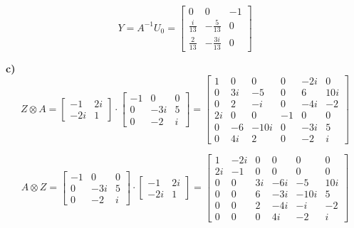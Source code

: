 \documentclass{article}
\begin{document}
\begin{equation}
    Y=A^{-1}U_0 = 
    \begin{bmatrix}
        0 & 0 & -1 \\
        \frac{i}{13} & -\frac{5}{13} & 0 \\
        \frac{2}{13} & -\frac{3i}{13} & 0 \nonumber
    \end{bmatrix}
\end{equation}


\textbf{c)}
\begin{equation}
    Z \otimes A=
    \begin{bmatrix} -1 & 2i \\ -2i & 1 \end{bmatrix}
    \cdot
    \begin{bmatrix}
-1 & 0 & 0 \\
0 & -3i & 5 \\
0 & -2 & i
\end{bmatrix}
=
\begin{bmatrix}
    1 & 0 & 0 & 0 & -2i & 0 \\
    0 & 3i & -5 & 0 & 6 & 10i \\
    0 & 2 & -i & 0 & -4i & -2 \\
    2i & 0 & 0 & -1 & 0 & 0 \\
    0 & -6 & -10i & 0 & -3i & 5 \\
    0 & 4i & 2 & 0 & -2 & i \nonumber
\end{bmatrix}
\end{equation}

\begin{equation}
    A \otimes Z=  
    \begin{bmatrix}
-1 & 0 & 0 \\
0 & -3i & 5 \\
0 & -2 & i
\end{bmatrix}
\cdot
    \begin{bmatrix} -1 & 2i \\ -2i & 1 \end{bmatrix}
=
\begin{bmatrix}
    1 & -2i & 0 & 0 & 0 & 0 \\
    2i & -1 & 0 & 0 & 0 & 0 \\
    0 & 0 & 3i & -6i & -5 & 10i \\
    0 & 0 & 6 & -3i & -10i & 5 \\
    0 & 0 & 2 & -4i & -i & -2 \\
    0 & 0 & 0 & 4i & -2 & i \nonumber
\end{bmatrix}
\end{equation}
\end{document}

